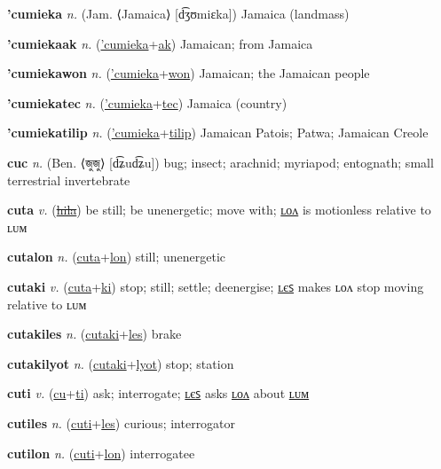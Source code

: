\textbf{\hypertarget{'cumieka}{'cumieka}} \textit{n.} (Jam. ⟨Jamaica⟩ [d͡ʒʊmiɛka])
Jamaica (landmass)

\textbf{\hypertarget{'cumiekaak}{'cumiekaak}} \textit{n.} (\hyperlink{'cumieka}{'cumieka}+\allowbreak \hyperlink{ak}{ak})
Jamaican; from Jamaica

\textbf{\hypertarget{'cumiekawon}{'cumiekawon}} \textit{n.} (\hyperlink{'cumieka}{'cumieka}+\allowbreak \hyperlink{won}{won})
Jamaican; the Jamaican people

\textbf{\hypertarget{'cumiekatec}{'cumiekatec}} \textit{n.} (\hyperlink{'cumieka}{'cumieka}+\allowbreak \hyperlink{tec}{tec})
Jamaica (country)

\textbf{\hypertarget{'cumiekatilip}{'cumiekatilip}} \textit{n.} (\hyperlink{'cumieka}{'cumieka}+\allowbreak \hyperlink{tilip}{tilip})
Jamaican Patois; Patwa; Jamaican Creole

\textbf{\hypertarget{cuc}{cuc}} \textit{n.} (Ben. ⟨{\bengali{}জুজু}⟩ [d͡ʑud͡ʑu])
bug; insect; arachnid; myriapod; entognath; small terrestrial invertebrate

\textbf{\hypertarget{cuta}{cuta}} \textit{v.} (\hyperlink{hila}{\sout{hila}})
be still; be unenergetic; move with; \hyperlink{cutalon}{ʟᴏᴧ} is motionless relative to ʟᴜᴍ

\textbf{\hypertarget{cutalon}{cutalon}} \textit{n.} (\hyperlink{cuta}{cuta}+\allowbreak \hyperlink{lon}{lon})
still; unenergetic

\textbf{\hypertarget{cutaki}{cutaki}} \textit{v.} (\hyperlink{cuta}{cuta}+\allowbreak \hyperlink{ki}{ki})
stop; still; settle; deenergise; \hyperlink{cutakiles}{ʟєꜱ} makes ʟᴏᴧ stop moving relative to ʟᴜᴍ

\textbf{\hypertarget{cutakiles}{cutakiles}} \textit{n.} (\hyperlink{cutaki}{cutaki}+\allowbreak \hyperlink{les}{les})
brake

\textbf{\hypertarget{cutakilyot}{cutakilyot}} \textit{n.} (\hyperlink{cutaki}{cutaki}+\allowbreak \hyperlink{lyot}{lyot})
stop; station

\textbf{\hypertarget{cuti}{cuti}} \textit{v.} (\hyperlink{cu}{cu}+\allowbreak \hyperlink{ti}{ti})
ask; interrogate; \hyperlink{cutiles}{ʟєꜱ} asks \hyperlink{cutilon}{ʟᴏᴧ} about \hyperlink{cutilum}{ʟᴜᴍ}

\textbf{\hypertarget{cutiles}{cutiles}} \textit{n.} (\hyperlink{cuti}{cuti}+\allowbreak \hyperlink{les}{les})
curious; interrogator

\textbf{\hypertarget{cutilon}{cutilon}} \textit{n.} (\hyperlink{cuti}{cuti}+\allowbreak \hyperlink{lon}{lon})
interrogatee

